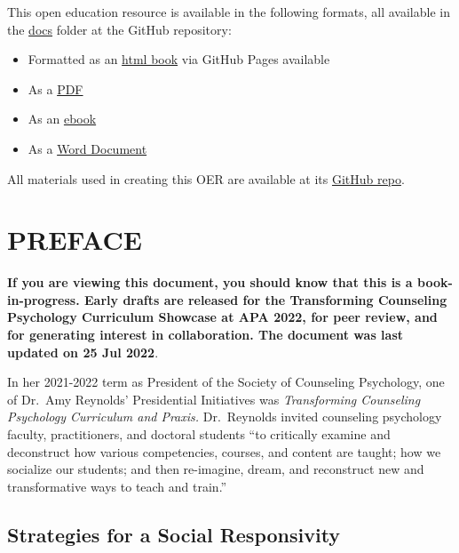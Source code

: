 \documentclass[
  11pt,
]{book}
\providecommand{\tightlist}{%
  \setlength{\itemsep}{0pt}\setlength{\parskip}{0pt}}
\begin{document}
This open education resource is available in the following formats, all available in the \href{https://github.com/lhbikos/TransformingResearchMethods/tree/main/docs}{docs} folder at the GitHub repository:

\begin{itemize}
\tightlist
\item
  Formatted as an \href{https://lhbikos.github.io/TransformingResearchMethods/}{html book} via GitHub Pages available
\item
  As a \href{https://github.com/lhbikos/TransformingResearchMethods/blob/main/docs/TransformingResearchMethods.pdf}{PDF}
\item
  As an \href{https://github.com/lhbikos/TransformingResearchMethods/blob/main/docs/TransformingResearchMethods.epub}{ebook}
\item
  As a \href{https://github.com/lhbikos/TransformingResearchMethods/blob/main/docs/TransformingResearchMethods.docx}{Word Document}
\end{itemize}

All materials used in creating this OER are available at its \href{https://github.com/lhbikos/TransformingResearchMethods}{GitHub repo}.

\hypertarget{preface}{%
\chapter*{PREFACE}\label{preface}}

\textbf{If you are viewing this document, you should know that this is a book-in-progress. Early drafts are released for the Transforming Counseling Psychology Curriculum Showcase at APA 2022, for peer review, and for generating interest in collaboration. The document was last updated on 25 Jul 2022}.

In her 2021-2022 term as President of the Society of Counseling Psychology, one of Dr.~Amy Reynolds' Presidential Initiatives was \emph{Transforming Counseling Psychology Curriculum and Praxis.} Dr.~Reynolds invited counseling psychology faculty, practitioners, and doctoral students ``to critically examine and deconstruct how various competencies, courses, and content are taught; how we socialize our students; and then re-imagine, dream, and reconstruct new and transformative ways to teach and train.''

\hypertarget{strategies-for-a-social-responsivity}{%
\section*{Strategies for a Social Responsivity}\label{strategies-for-a-social-responsivity}}
\end{document}
